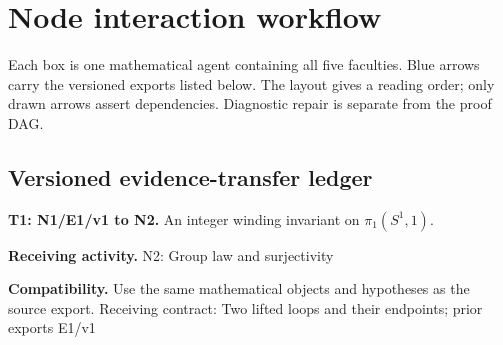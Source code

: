 \documentclass[preprint,12pt,aps,pra,showkeys,amsmath,amssymb,superscriptaddress,floatfix]{revtex4-2}
\theoremstyle{definition}
\theoremstyle{remark}
\newcommand{\field}[2]{\par\smallskip\noindent\textbf{#1.} #2\par}
\begin{document}
\clearpage\section{Node interaction workflow}

\begin{center}\end{center}

Each box is one mathematical agent containing all five faculties. Blue
arrows carry the versioned exports listed below. The layout gives a
reading order; only drawn arrows assert dependencies. Diagnostic repair
is separate from the proof DAG.

\subsection{Versioned evidence-transfer ledger}

\begingroup\small\linespread{1.05}\selectfont

\field{T1: N1/E1/v1 to N2}{An integer winding invariant on \(\pi _{1}(S^{1},1)\).}

\field{Receiving activity}{N2: Group law and surjectivity}

\field{Compatibility}{Use the same mathematical objects and hypotheses as the source export.
Receiving contract: Two lifted loops and their endpoints; prior exports
E1/v1}
\end{document}
